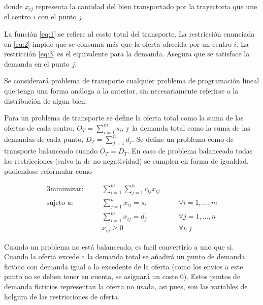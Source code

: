 donde $x_{ij}$ representa la cantidad del bien transportado por la trayectoria que une el centro $i$ con el punto $j$.

\vspace*{2mm}

La función \ref{eq:1} se refiere al coste total del transporte. La restricción enunciada en \ref{eq:2} impide que se 
consuma más que la oferta ofrecida por un centro $i$. La restricción \ref{eq:3} es el equivalente para la demanda. Asegura
que se satisface la demanda en el punto $j$.

\vspace*{2mm}

Se considerará problema de transporte cualquier problema de programación lineal que tenga una forma análoga a la anterior,
sin necesariamente referirse a la distribución de algun bien.

\newpage

Para un problema de transporte se define la oferta total como la suma de las ofertas de cada centro, $O_T=\sum^m_{i=1}s_i$,
y la demanda total como la suma de las demandas de cada punto, $D_T=\sum^n_{j=1}d_j$. Se define un problema como de transporte 
balanceado cuando $O_T=D_T$. En caso de problema balanceado todas las restricciones (salvo la de no negatividad) se cumplen en
forma de igualdad, pudiendose reformular como

\begin{alignat}{3}
    \text{minimizar:}   & \quad & \sum^m_{i=1}\sum^n_{j=1}c_{ij}x_{ij}     & \quad &                        \\
    \text{sujeto a:}    & \quad & \sum^n_{j=1}x_{ij}= s_i                  &       & \forall i=1,\dots,m    \\
                        & \quad & \sum^m_{i=1}x_{ij}= d_j                  &       & \forall j=1,\dots,n    \\
                        & \quad & x_{ij}\geq 0                             &       & \forall i,j            
\end{alignat}

Cuando un problema no está balanceado, es facil convertirlo a uno que si. Cuando la oferta excede a la demanda total se 
añadirá un punto de demanda ficticio con demanda igual a la excedente de la oferta (como los envios a este punto no
se deben tener en cuenta, se asignará un coste 0). Estos puntos de demanda ficticios representan la oferta no usada, asi
pues, son las variables de holgura de las restricciones de oferta.

